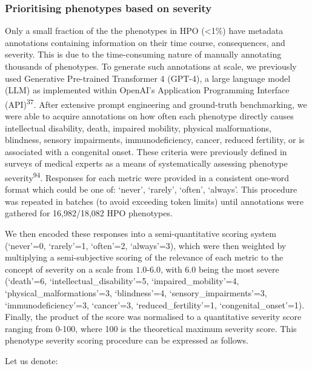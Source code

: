 \documentclass[
]{article}
\begin{document}
\subsubsection{Prioritising phenotypes based on
severity}\label{prioritising-phenotypes-based-on-severity-1}

Only a small fraction of the the phenotypes in HPO (\textless1\%) have
metadata annotations containing information on their time course,
consequences, and severity. This is due to the time-consuming nature of
manually annotating thousands of phenotypes. To generate such
annotations at scale, we previously used Generative Pre-trained
Transformer 4 (GPT-4), a large language model (LLM) as implemented
within OpenAI's Application Programming Interface
(API)\textsuperscript{37}. After extensive prompt engineering and
ground-truth benchmarking, we were able to acquire annotations on how
often each phenotype directly causes intellectual disability, death,
impaired mobility, physical malformations, blindness, sensory
impairments, immunodeficiency, cancer, reduced fertility, or is
associated with a congenital onset. These criteria were previously
defined in surveys of medical experts as a means of systematically
assessing phenotype severity\textsuperscript{94}. Responses for each
metric were provided in a consistent one-word format which could be one
of: `never', `rarely', `often', `always'. This procedure was repeated in
batches (to avoid exceeding token limits) until annotations were
gathered for 16,982/18,082 HPO phenotypes.

We then encoded these responses into a semi-quantitative scoring system
(`never'=0, `rarely'=1, `often'=2, `always'=3), which were then weighted
by multiplying a semi-subjective scoring of the relevance of each metric
to the concept of severity on a scale from \(1.0\)-\(6.0\), with \(6.0\)
being the most severe (`death'=6, `intellectual\_disability'=5,
`impaired\_mobility'=4, `physical\_malformations'=3, `blindness'=4,
`sensory\_impairments'=3, `immunodeficiency'=3, `cancer'=3,
`reduced\_fertility'=1, `congenital\_onset'=1). Finally, the product of
the score was normalised to a quantitative severity score ranging from
0-100, where 100 is the theoretical maximum severity score. This
phenotype severity scoring procedure can be expressed as follows.

Let us denote:
\end{document}
